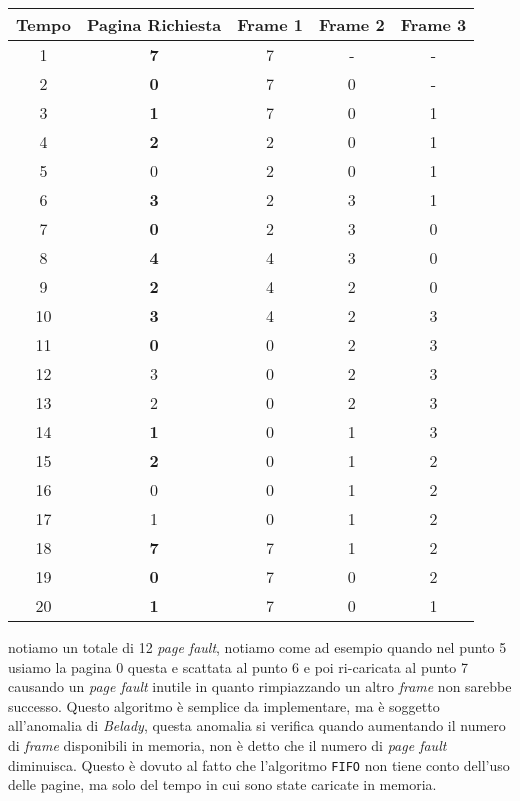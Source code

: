         \begin{table}[H]
            \centering
            \begin{tabular}{|c|c|c|c|c|}
                \hline
                \textbf{Tempo} & \textbf{Pagina Richiesta} & \textbf{Frame 1} & \textbf{Frame 2} & \textbf{Frame 3} \\
                \hline
                1 & \textbf{7} & 7 & - & - \\
                2 & \textbf{0} & 7 & 0 & - \\
                3 & \textbf{1} & 7 & 0 & 1 \\
                4 & \textbf{2} & 2 & 0 & 1 \\
                5 & 0 & 2 & 0 & 1 \\
                6 & \textbf{3} & 2 & 3 & 1 \\
                7 & \textbf{0} & 2 & 3 & 0 \\
                8 & \textbf{4} & 4 & 3 & 0 \\
                9 & \textbf{2} & 4 & 2 & 0 \\
                10 & \textbf{3} & 4 & 2 & 3 \\
                11 & \textbf{0} & 0 & 2 & 3 \\
                12 & 3 & 0 & 2 & 3 \\
                13 & 2 & 0 & 2 & 3 \\
                14 & \textbf{1} & 0 & 1 & 3 \\
                15 & \textbf{2} & 0 & 1 & 2 \\
                16 & 0 & 0 & 1 & 2 \\
                17 & 1 & 0 & 1 & 2 \\
                18 & \textbf{7} & 7 & 1 & 2 \\
                19 & \textbf{0} & 7 & 0 & 2 \\
                20 & \textbf{1} & 7 & 0 & 1 \\
                \hline
            \end{tabular}
        \end{table}
        notiamo un totale di 12 \textit{page fault}, notiamo come ad esempio quando nel punto 5 usiamo la pagina 0 questa e scattata al punto 6 e poi ri-caricata al punto 7 causando un \textit{page fault} inutile in quanto rimpiazzando un altro \textit{frame} non sarebbe successo. Questo algoritmo è semplice da implementare, ma è soggetto all'anomalia di \textit{Belady}, questa anomalia si verifica quando aumentando il numero di \textit{frame} disponibili in memoria, non è detto che il numero di \textit{page fault} diminuisca. Questo è dovuto al fatto che l'algoritmo \texttt{FIFO} non tiene conto dell'uso delle pagine, ma solo del tempo in cui sono state caricate in memoria. 
